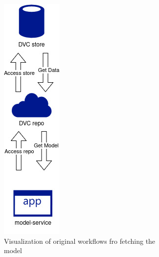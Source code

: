 \begin{figure}[t]
    \centering
    \begin{subfigure}[b]{0.45\linewidth}
        \centering
        \includegraphics[width=0.35\linewidth]{images/original_fetch.jpg}
        \caption{Visualization of original workflows fro fetching the model}
        \label{fig:libversion-workflow1}
    \end{subfigure}
    \hfill
    \begin{subfigure}[b]{0.45\linewidth}
        \centering

\end{subfigure}
\end{figure}

